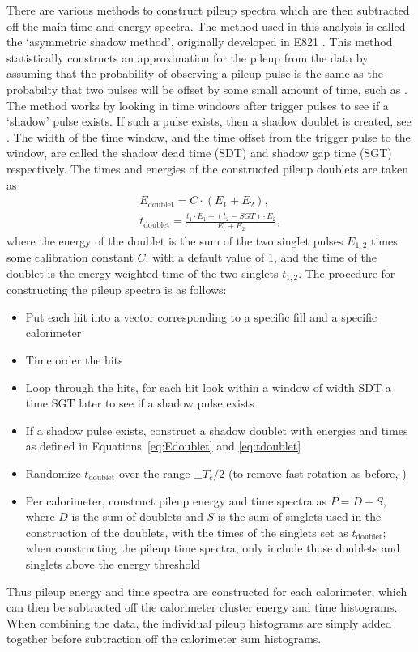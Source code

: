 There are various methods to construct pileup spectra which are then subtracted off the main time and energy spectra. The method used in this analysis is called the `asymmetric shadow method', originally developed in E821 \cite{E821PileupShadow}. This method statistically constructs an approximation for the pileup from the data by assuming that the probability of observing a pileup pulse is the same as the probabilty that two pulses will be offset by some small amount of time, such as . The method works by looking in time windows after trigger pulses to see if a `shadow' pulse exists. If such a pulse exists, then a shadow doublet is created, see . The width of the time window, and the time offset from the trigger pulse to the window, are called the shadow dead time (SDT) and shadow gap time (SGT) respectively. The times and energies of the constructed pileup doublets are taken as
            \begin{gather}
                E_{\text{doublet}} = C \cdot (E_{1} + E_{2}), \label{eq:Edoublet} \\
                t_{\text{doublet}} = \frac{t_{1} \cdot E_{1} + (t_{2}-SGT) \cdot E_{2}}{E_{1} + E_{2}}, \label{eq:tdoublet}
            \end{gather}
where the energy of the doublet is the sum of the two singlet pulses $E_{1,2}$ times some calibration constant $C$, with a default value of 1, and the time of the doublet is the energy-weighted time of the two singlets $t_{1,2}$. The procedure for constructing the pileup spectra is as follows:
\begin{itemize}
    \item{Put each hit into a vector corresponding to a specific fill and a specific calorimeter}
    \item{Time order the hits}
    \item{Loop through the hits, for each hit look within a window of width SDT a time SGT later to see if a shadow pulse exists}
    \item{If a shadow pulse exists, construct a shadow doublet with energies and times as defined in Equations~\ref{eq:Edoublet} and \ref{eq:tdoublet}}
    \item{Randomize $t_{\text{doublet}}$ over the range $\pm T_{c}/2$ (to remove fast rotation as before, )}
    \item{Per calorimeter, construct pileup energy and time spectra as $P = D - S$, where $D$ is the sum of doublets and $S$ is the sum of singlets used in the construction of the doublets, with the times of the singlets set as $t_{\text{doublet}}$; when constructing the pileup time spectra, only include those doublets and singlets above the energy threshold}
\end{itemize}
Thus pileup energy and time spectra are constructed for each calorimeter, which can then be subtracted off the calorimeter cluster energy and time histograms. When combining the data, the individual pileup histograms are simply added together before subtraction off the calorimeter sum histograms. 


